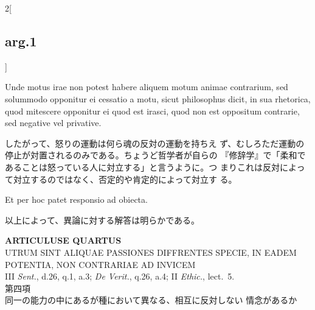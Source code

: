 \documentclass[paper=a4paper,fontsize=10pt,jafontsize=9pt,titlepage]{jlreq}
\begin{document}
\begin{paracol}{2}[\subsection{arg.1}]
\switchcolumn*

Unde motus irae
 non potest habere aliquem motum animae contrarium, sed solummodo
 opponitur ei cessatio a motu, sicut philosophus dicit, in sua
 rhetorica, quod mitescere opponitur ei quod est irasci, quod non est
 oppositum contrarie, sed negative vel privative.

\switchcolumn

したがって、怒りの運動は何ら魂の反対の運動を持ちえ
 ず、むしろただ運動の停止が対置されるのみである。ちょうど哲学者が自らの
 『修辞学』で「柔和であることは怒っている人に対立する」と言うように。つ
 まりこれは反対によっ て対立するのではなく、否定的や肯定的によって対立す
 る。

\switchcolumn*

Et per hoc patet responsio ad obiecta.

\switchcolumn

以上によって、異論に対する解答は明らかである。

\end{paracol}
\newpage
{}
{}
\setcounter{section}{4}
\setcounter{subsection}{0}


\begin{center}
{\Large {\bfseries ARTICULUSE QUARTUS}\\
{\large UTRUM SINT ALIQUAE PASSIONES DIFFRENTES SPECIE, IN EADEM
 POTENTIA, NON CONTRARIAE AD INVICEM}}\\
{\footnotesize III {\itshape Sent.}, d.26, q.1, a.3; {\itshape De
 Verit.}, q.26, a.4; II {\itshape Ethic.}, lect.~5.}\\
{\Large 第四項\\同一の能力の中にあるが種において異なる、相互に反対しない
 情念があるか}
\end{center}
\end{document}
